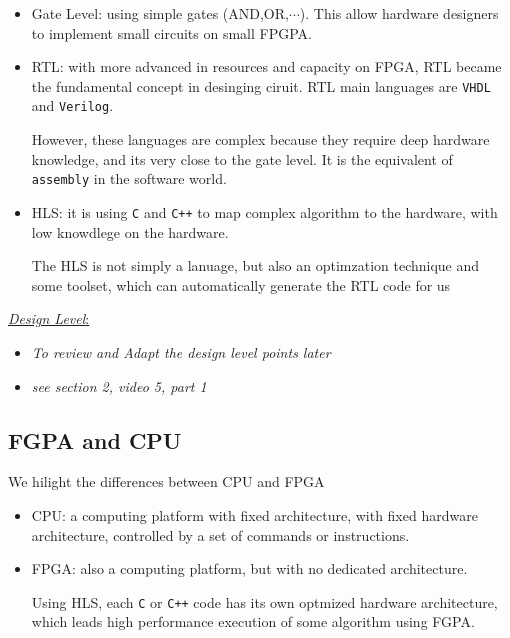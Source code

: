 \begin{itemize}

\item Gate Level: using simple gates (AND,OR,$\cdots$). This allow hardware designers to implement small circuits on small FPGPA.

\item RTL: with more advanced in resources and capacity on FPGA, RTL became the fundamental concept in desinging ciruit. RTL main languages are \verb|VHDL| and \verb|Verilog|.

However, these languages are complex because they require deep hardware knowledge, and its very close to the gate level. It is the equivalent of \verb|assembly| in the software world.

\item HLS: it is using \verb|C| and \verb|C++| to map complex algorithm to the hardware, with low knowdlege on the hardware. 

The HLS is not simply a lanuage, but also an optimzation technique and some toolset, which can automatically generate the RTL code for us

\end{itemize}

 \underline{\textit{Design Level}:}

\begin{itemize}

\item  \textit{To review and Adapt the design level points later}

\item \textit{see section 2, video 5, part 1}

\end{itemize}

\subsection{FGPA and CPU}

We hilight the differences between CPU and FPGA

\begin{itemize}

\item CPU: a computing platform with fixed architecture, with fixed hardware architecture, controlled by a set of commands or instructions.

\item FPGA: also a computing platform, but with no dedicated architecture.

Using HLS, each \verb|C| or \verb|C++| code has its own optmized hardware architecture, which leads high performance execution of some algorithm using FGPA.

\end{itemize}


